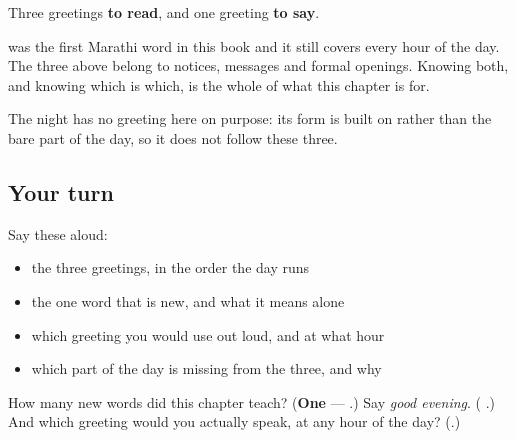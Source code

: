 \begin{grammarlens}[title={What you've built}]
Three greetings \textbf{to read}, and one greeting \textbf{to say}.

\textbf{} was the first Marathi word in this book and it still covers every hour of the day. The three above belong to notices, messages and formal openings. Knowing both, and knowing which is which, is the whole of what this chapter is for.

The night has no greeting here on purpose: its form is built on \textbf{} rather than the bare part of the day, so it does not follow these three.
\end{grammarlens}

\subsection*{Your turn}
Say these aloud:

\begin{itemize}
\raggedright
  \item the three greetings, in the order the day runs
  \item the one word that is new, and what it means alone
  \item which greeting you would use out loud, and at what hour
  \item which part of the day is missing from the three, and why
\end{itemize}

\begin{tcolorbox}[breakable,colback=teal!4,colframe=teal!35!black,title={Before you move on}]
How many new words did this chapter teach? (\textbf{One} — \textbf{}.) Say \emph{good evening}. (\emph{\textbf{ }}.) And which greeting would you actually speak, at any hour of the day? (\emph{\textbf{}}.)
\end{tcolorbox}
